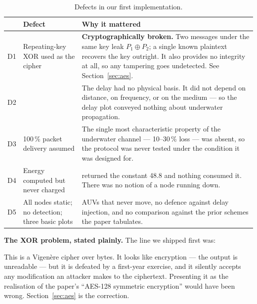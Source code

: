 \begin{table}[H]
\centering
\caption{Defects in our first implementation.}
\label{tab:defects}
\small
\begin{tabularx}{\textwidth}{@{}L{6mm} L{36mm} X@{}}
\toprule
& \textbf{Defect} & \textbf{Why it mattered}\\
\midrule
D1 & Repeating-key XOR used as the cipher &
  \textbf{Cryptographically broken.} Two messages under the same key leak
  $P_1 \oplus P_2$; a single known plaintext recovers the key outright. It also provides no
  integrity at all, so any tampering goes undetected. See Section~\ref{sec:aes}.\\
\addlinespace[2pt]
D2 &  &
  The delay had no physical basis. It did not depend on distance, on frequency, or on the
  medium --- so the delay plot conveyed nothing about underwater propagation.\\
\addlinespace[2pt]
D3 & 100\,\% packet delivery assumed &
  The single most characteristic property of the underwater channel --- 10--30\,\% loss ---
  was absent, so the protocol was never tested under the condition it was designed for.\\
\addlinespace[2pt]
D4 & Energy computed but never charged &
   returned the constant 48.8 and nothing consumed it. There was
  no notion of a node running down.\\
\addlinespace[2pt]
D5 & All nodes static; no detection; three basic plots &
  AUVs that never move, no defence against delay injection, and no comparison against the
  prior schemes the paper tabulates.\\
\bottomrule
\end{tabularx}
\end{table}

\begin{warnbox}
\textbf{The XOR problem, stated plainly.} The line we shipped first was:
\begin{center}
\end{center}
This is a Vigen\`ere cipher over bytes. It looks like encryption --- the output is
unreadable --- but it is defeated by a first-year exercise, and it silently accepts any
modification an attacker makes to the ciphertext. Presenting it as the realisation of the
paper's ``AES-128 symmetric encryption'' would have been wrong. Section~\ref{sec:aes} is
the correction.
\end{warnbox}
